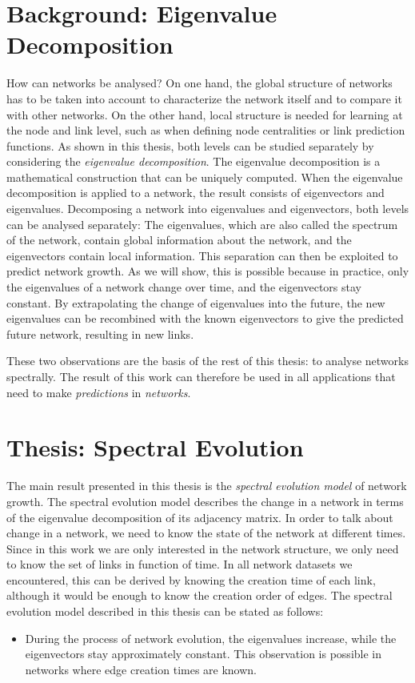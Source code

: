 \documentclass[11pt,a4paper]{book}
\begin{document}
\section{Background:  Eigenvalue Decomposition}
How can networks be analysed?  On one hand, the global structure of 
networks has to be taken into account to characterize the network
itself and to compare it with other networks.  On the other hand, local
structure is needed for learning at the node and link level, such as
when defining node centralities or link prediction functions.  As
shown in this 
thesis, both levels can be studied separately by considering the
\emph{eigenvalue decomposition}. 
The eigenvalue decomposition is a mathematical construction that can be
uniquely computed.  When the eigenvalue decomposition is applied to a
network, the result consists of eigenvectors and eigenvalues.  
Decomposing a network into eigenvalues and 
eigenvectors, both levels can be analysed separately:  The eigenvalues, which are
also called the spectrum of the network, contain global
information about the network, and the eigenvectors contain local
information.  
This separation can then be exploited to predict network
growth.  As we will show, this is possible because in practice, only the
eigenvalues of a network change over time, and the eigenvectors stay
constant.  By extrapolating the change of eigenvalues into the future,
the new eigenvalues can be recombined with the known eigenvectors to
give the predicted future network, resulting in new links. 

These two observations are the basis of the rest of this thesis:  to
analyse networks spectrally.  The result of this work can therefore be used in all
applications that need to make \emph{predictions} in \emph{networks}. 

\section{Thesis: Spectral Evolution}
The main result presented in this thesis is the \emph{spectral evolution
  model} of network growth.  The spectral evolution model describes the change
in a network in terms of the eigenvalue decomposition of its adjacency
matrix.  In order to talk about change in a network, we need to know the
state of the network at different times. Since in this work we are only
interested in the network structure, we only need to know
the set of links in function of time.  In all network datasets we
encountered, this can be derived by knowing the creation time of each
link, although it would be enough to know the creation order of edges. 
The spectral evolution model described in this thesis can be stated as
follows: 
\begin{itemize}
\item During the process of network evolution, the eigenvalues
  increase, while the eigenvectors stay approximately constant.  This
  observation is possible in networks where edge creation times are
  known. 
\end{itemize}
\end{document}
